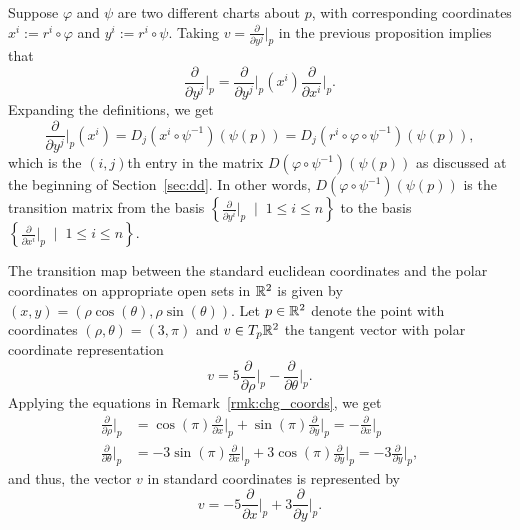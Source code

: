 \begin{remark}\label{rmk:chg_coords}
  Suppose $\varphi$ and $\psi$ are two different charts about $p$, with corresponding coordinates $x^i := r^i \circ \varphi$ and $y^i := r^i \circ \psi$.
  Taking $v = \frac{\partial}{\partial y^j}\Big|_p$ in the previous proposition implies that
  \begin{equation}
    \frac{\partial}{\partial y^j}\Big|_p =
    \frac{\partial}{\partial y^j}\Big|_p (x^i) \frac{\partial}{\partial x^i}\Big|_p.
  \end{equation}
  Expanding the definitions, we get
  \begin{equation}
    \frac{\partial}{\partial y^j}\Big|_p (x^i) =
    D_j(x^i\circ\psi^{-1})(\psi(p)) =
    D_j(r^i \circ \varphi \circ \psi^{-1})(\psi(p)),
  \end{equation}
  which is the $(i,j)$th entry in the matrix $D(\varphi\circ\psi^{-1})(\psi(p))$ as discussed at the beginning of Section~\ref{sec:dd}.
  In other words, $D(\varphi\circ\psi^{-1})(\psi(p))$ is the transition matrix from the basis $\left\{\frac{\partial}{\partial y^i}\Big|_p\;\mid\; 1\leq i\leq n\right\}$ to the basis $\left\{\frac{\partial}{\partial x^i}\Big|_p\;\mid\; 1\leq i\leq n\right\}$.
\end{remark}

\begin{example}
  The transition map between the standard euclidean coordinates and the polar coordinates on appropriate open sets in $\mathbb{R}^2$ is given by $(x,y) = (\rho\cos(\theta), \rho\sin(\theta))$. Let $p\in\mathbb{R}^2$ denote the point with coordinates $(\rho, \theta) = (3, \pi)$ and $v\in T_p\mathbb{R}^2$ the tangent vector with polar coordinate representation
  \begin{equation}
    v = 5\frac{\partial}{\partial \rho}\Big|_p - \frac{\partial}{\partial \theta}\Big|_p.
  \end{equation}
  Applying the equations in Remark~\ref{rmk:chg_coords}, we get
  \begin{align}
    \frac{\partial}{\partial \rho}\Big|_p
     & = \cos(\pi)\frac{\partial}{\partial x}\Big|_p + \sin(\pi)\frac{\partial}{\partial y}\Big|_p = - \frac{\partial}{\partial x}\Big|_p      \\
    \frac{\partial}{\partial \theta}\Big|_p
     & = -3\sin(\pi)\frac{\partial}{\partial x}\Big|_p + 3\cos(\pi)\frac{\partial}{\partial y}\Big|_p = -3 \frac{\partial}{\partial y}\Big|_p,
  \end{align}
  and thus, the vector $v$ in standard coordinates is represented by
  \begin{equation}
    v = - 5 \frac{\partial}{\partial x}\Big|_p + 3 \frac{\partial}{\partial y}\Big|_p.
  \end{equation}
\end{example}


